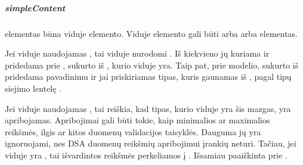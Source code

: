 \documentclass[letterpaper,10pt,lithuanian]{sphinxmanual}
\begin{document}
\subparagraph{simpleContent}
\label{\detokenize{schemos/xsd:simplecontent}}\label{\detokenize{schemos/xsd:xsd-simple-content}}
\sphinxAtStartPar
{} elementas būna viduje  elemento. Viduje  elemento gali
būti arba {\hyperref[\detokenize{schemos/xsd:xsd-restriction}]{}} arba {\hyperref[\detokenize{schemos/xsd:xsd-extension}]{}} elementas.

\sphinxAtStartPar
Jei  viduje naudojamas {\hyperref[\detokenize{schemos/xsd:xsd-extension}]{}}, tai {\hyperref[\detokenize{schemos/xsd:xsd-extension}]{}} viduje nurodomi
{\hyperref[\detokenize{schemos/xsd:xsd-attribute}]{}}. Iš kiekvieno jų kuriama {\hyperref[\detokenize{formatas:property}]{}} ir pridedama prie {\hyperref[\detokenize{formatas:model}]{}}, sukurto
iš , kurio viduje yra. Taip pat, prie modelio, sukurto iš  pridedama {\hyperref[\detokenize{formatas:property}]{}} pavadinimu
 ir jai priskiriamas tipas, kuris gaunamas iš {\hyperref[\detokenize{schemos/xsd:xsd-base}]{}}, pagal tipų siejimo lentelę
.

\sphinxAtStartPar
Jei  viduje naudojamas {\hyperref[\detokenize{schemos/xsd:xsd-restriction}]{}}, tai reiškia, kad tipas, kurio viduje
yra šis mazgas, yra apribojamas. Apribojimai gali būti tokie, kaip minimalios ar maximalios reikšmės,
ilgis ar kitos duomenų validacijos taisyklės. Dauguma jų yra ignoruojami, nes DSA duomenų reikšmių
apribojimui įrankių neturi. Tačiau, jei {\hyperref[\detokenize{schemos/xsd:xsd-restriction}]{}} viduje yra ,
tai išvardintos reikšmės perkeliamos į {\hyperref[\detokenize{dimensijos:enum}]{}}. Išsamiau paaiškinta prie {\hyperref[\detokenize{schemos/xsd:xsd-enumeration}]{}}.
\end{document}
